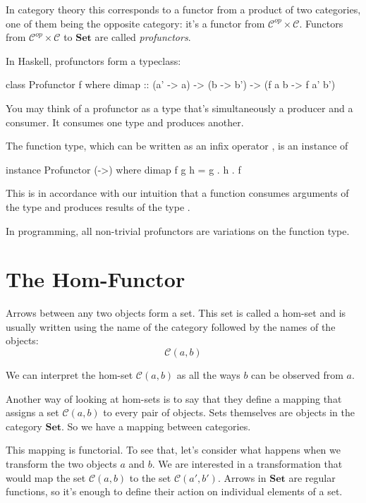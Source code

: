 \documentclass[DaoFP]{subfiles}
\begin{document}
In category theory this corresponds to a functor from a product of two categories, one of them being the opposite category: it's a functor from $\mathcal{C}^{op} \times \mathcal{C}$. Functors from $\mathcal{C}^{op} \times \mathcal{C}$ to $\mathbf{Set}$ are called \emph{profunctors}.

In Haskell, profunctors form a typeclass:
\begin{haskell}
class Profunctor f where
  dimap :: (a' -> a) -> (b -> b') -> (f a b -> f a' b')
\end{haskell}

You may think of a profunctor as a type that's simultaneously a producer and a consumer. It consumes one type and produces another.

The function type, which can be written as an infix operator \hask{(->)}, is an instance of 
\begin{haskell}
instance Profunctor (->) where
  dimap f g h = g . h . f
\end{haskell}
This is in accordance with our intuition that a function  consumes arguments of the type  and produces results of the type .

In programming, all non-trivial profunctors are variations on the function type. 

\section{The Hom-Functor}

Arrows between any two objects form a set. This set is called a hom-set and is usually written using the name of the category followed by the names of the objects:
\[ \mathcal{C}(a, b) \]

We can interpret the hom-set $\mathcal{C}(a, b)$ as all the ways $b$ can be observed from $a$. 

Another way of looking at hom-sets is to say that they define a mapping that assigns a set $\mathcal{C}(a, b)$ to every pair of objects. Sets themselves are objects in the category $\mathbf{Set}$. So we have a mapping between categories.

This mapping is functorial. To see that, let's consider what happens when we transform the two objects $a$ and $b$. We are interested in a transformation that would map the set $\mathcal{C}(a, b)$ to the set $\mathcal{C}(a', b')$. Arrows in $\mathbf{Set}$ are regular functions, so it's enough to define their action on individual elements of a set. 
\end{document}
